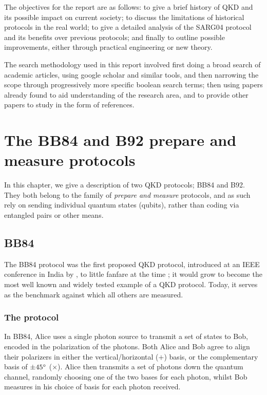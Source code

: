 \documentclass[paper=a4, fontsize=11pt]{scrartcl} %
\numberwithin{equation}{section} %
\numberwithin{figure}{section} %
\numberwithin{table}{section} %
\begin{document}
The objectives for the report are as follows: to give a brief history of QKD and its possible impact on current
society; to discuss the limitations of historical protocols in the real world; to give a detailed analysis of the
SARG04 protocol and its benefits over previous protocols; and finally to outline possible improvements,
either through practical engineering or new theory.

The search methodology used in this report involved first doing a broad search of academic articles, using google scholar and similar
tools, and then narrowing the scope through progressively more specific boolean search terms; then using papers already found to aid understanding
of the research area, and to provide other papers to study in the form of references.

\clearpage
\section{The BB84 and B92 prepare and measure protocols}

In this chapter, we give a description of two QKD protocols; BB84 and B92.
They both belong to the family of \textit{prepare and measure} protocols, and as
such rely on sending individual quantum states (qubits), rather than coding
via entangled pairs or other means.

\subsection{BB84}

The BB84 protocol was the first proposed QKD protocol, introduced at
an IEEE conference in India by \citet{BB84}, to little fanfare at the
time \citep{historyBrassard}; it would grow to become the most well known
and widely tested example of a QKD protocol. Today, it serves as
the benchmark against which all others are measured.

\subsubsection*{The protocol}
In BB84, Alice uses a single photon source to transmit a set of states to Bob,
encoded in the polarization of the photons. Both Alice and Bob agree to align
their polarizers in either the vertical/horizontal ($+$) basis, or the
complementary basis of $\pm 45 \degree$  ($\times$). Alice then transmits a set of photons
down the quantum channel, randomly choosing one of the two bases for each
photon, whilst Bob measures in his choice of basis for each photon received.
\end{document}
